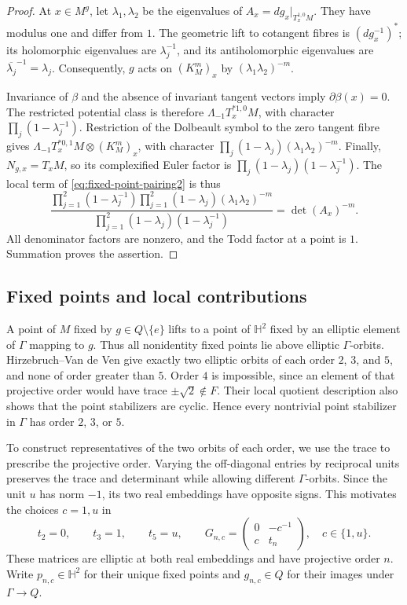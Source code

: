 \documentclass[11pt]{article}
\theoremstyle{definition}
\theoremstyle{plain}
\numberwithin{equation}{section}
\newcommand{\HH}{\mathbb H}
\begin{document}
\begin{proof}
At $x\in M^g$, let $\lambda_1,\lambda_2$ be the eigenvalues of
$A_x=dg_x|_{T_x^{1,0}M}$. They have modulus one and differ from
$1$. The geometric lift to cotangent fibres is
$(dg_x^{-1})^*$; its holomorphic eigenvalues are $\lambda_j^{-1}$,
and its antiholomorphic eigenvalues are
$\overline{\lambda_j}^{-1}=\lambda_j$.
Consequently, $g$ acts on $(K_M^m)_x$ by
$(\lambda_1\lambda_2)^{-m}$.

Invariance of $\beta$ and the absence of invariant tangent
vectors imply $\partial\beta(x)=0$. The restricted potential
class is therefore $\Lambda_{-1}T_x^{*1,0}M$, with character
$\prod_j(1-\lambda_j^{-1})$. Restriction of the Dolbeault
symbol to the zero tangent fibre gives
$\Lambda_{-1}T_x^{*0,1}M\otimes(K_M^m)_x$, with character
$\prod_j(1-\lambda_j)(\lambda_1\lambda_2)^{-m}$.
Finally, $N_{g,x}=T_xM$, so its complexified Euler factor is
$\prod_j(1-\lambda_j)(1-\lambda_j^{-1})$.
The local term of \eqref{eq:fixed-point-pairing2} is thus
\[
 \frac{\prod_{j=1}^2(1-\lambda_j^{-1})
       \prod_{j=1}^2(1-\lambda_j)
       (\lambda_1\lambda_2)^{-m}}
      {\prod_{j=1}^2(1-\lambda_j)(1-\lambda_j^{-1})}
       =\det(A_x)^{-m}.
\]
All denominator factors are nonzero, and the Todd factor at a
point is $1$. Summation proves the assertion.
\end{proof}




\subsection{Fixed points and local contributions}
\label{subsec:a5-calculation}

A point of $M$ fixed by $g\in Q\setminus\{e\}$
lifts to a point of $\HH^2$ fixed by an elliptic
element of $\Gamma$ mapping to $g$.
Thus all nonidentity fixed points lie above
elliptic $\Gamma$-orbits.
Hirzebruch--Van de Ven
\cite[Proposition~II.1]{HirzebruchVanDeVen}
give exactly two elliptic orbits of each order
$2$, $3$, and $5$, and none of order greater
than $5$. Order $4$ is impossible, since an
element of that projective order would have
trace $\pm\sqrt{2}\notin F$.
Their local quotient description also shows
that the point stabilizers are cyclic.
Hence every nontrivial point stabilizer in
$\Gamma$ has order $2$, $3$, or $5$.

To construct representatives of the two
orbits of each order, we use the trace to
prescribe the projective order.
Varying the off-diagonal entries by reciprocal
units preserves the trace and determinant
while allowing different $\Gamma$-orbits.
Since the unit $u$ has norm $-1$, its two
real embeddings have opposite signs.
This motivates the choices $c=1,u$ in
\begin{equation}\label{eq:a5-generators}
t_2=0,\qquad t_3=1,\qquad t_5=u,\qquad
G_{n,c}=
\begin{pmatrix}
0&-c^{-1}\\
c&t_n
\end{pmatrix},
\quad c\in\{1,u\}.
\end{equation}
These matrices are elliptic at both real
embeddings and have projective order $n$.
Write $p_{n,c}\in\HH^2$ for their unique
fixed points and $g_{n,c}\in Q$ for their
images under $\Gamma\to Q$.
\end{document}
